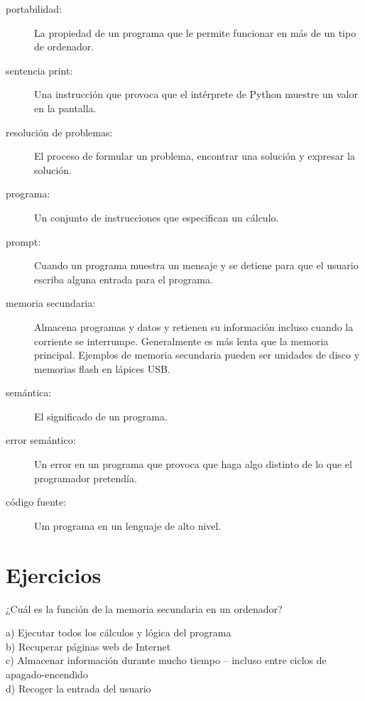 \begin{description}
\item[portabilidad:]  La propiedad de un programa que le permite funcionar en más
de un tipo de ordenador.

\item[sentencia print:]  Una instrucción que provoca que el intérprete de Python
muestre un valor en la pantalla.

\item[resolución de problemas:]  El proceso de formular un problema, encontrar
una solución y expresar la solución.

\item[programa:] Un conjunto de instrucciones que especifican un cálculo.

\item[prompt:] Cuando un programa muestra un mensaje y se detiene para que
el usuario escriba alguna entrada para el programa.

\item[memoria secundaria:] Almacena programas y datos y retienen su
información incluso cuando la corriente se interrumpe. Generalmente es más lenta
que la memoria principal. Ejemplos de memoria secundaria pueden ser unidades de
disco y memorias flash en lápices USB.

\item[semántica:] El significado de un programa.

\item[error semántico:] Un error en un programa que provoca que haga algo
distinto de lo que el programador pretendía.

\item[código fuente:]  Um programa en un lenguaje de alto nivel.

\end{description}

\section{Ejercicios}


\begin{ex}
¿Cuál es la función de la memoria secundaria en un ordenador?

a) Ejecutar todos los cálculos y lógica del programa\\
b) Recuperar páginas web de Internet\\
c) Almacenar información durante mucho tiempo -- incluso entre ciclos de apagado-encendido\\
d) Recoger la entrada del usuario
\end{ex}

